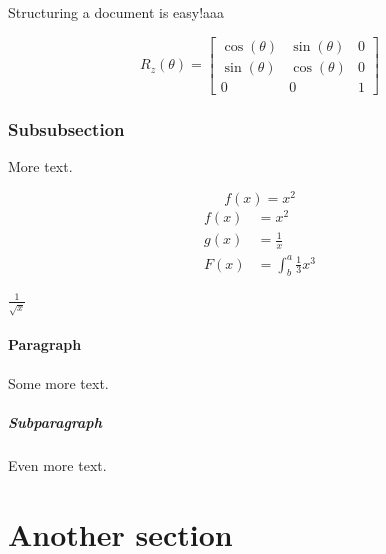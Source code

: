 \documentclass{article}
\begin{document}
Structuring a document is easy!aaa

\[    %
R_z (\theta)=
\begin{bmatrix}
    \cos(\theta) & \sin(\theta)  & 0 \\
    \sin(\theta) &  \cos(\theta)  & 0 \\
    0            & 0             & 1
\end{bmatrix}
\]    %

\subsubsection{Subsubsection}

More text.

\begin{equation*}
  f(x) = x^2
\end{equation*}
\begin{align*}
  f(x) &= x^2\\
  g(x) &= \frac{1}{x}\\
  F(x) &= \int^a_b \frac{1}{3}x^3
\end{align*}

\(\frac{1}{\sqrt{x}}\)

\paragraph{Paragraph}

Some more text.

\subparagraph{Subparagraph}

Even more text.

\section{Another section}
\end{document}
